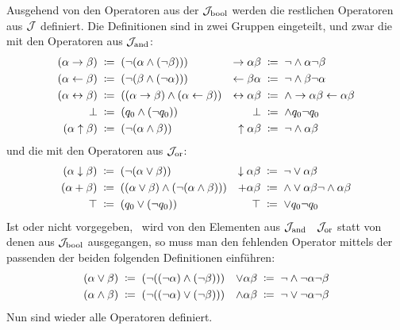 Ausgehend von den Operatoren aus der  $\mathcal{J}_{\mathrm{bool}}$ werden die restlichen Operatoren aus $\mathcal{J}$ definiert. Die Definitionen sind in zwei Gruppen eingeteilt, und zwar die mit den Operatoren aus $\mathcal{J}_{\mathrm{and}}$:
\begin{align}
	(\alpha \rightarrow \beta) &\;\coloneqq\; (\lnot (\alpha \land  (\lnot \beta))) &
	\rightarrow \alpha \beta   &\;\coloneqq\;  \lnot    \land \alpha \lnot \beta
	\label{def:imp}
	\\
	(\alpha \leftarrow \beta) &\;\coloneqq\; (\lnot (\beta \land  (\lnot \alpha))) &
	\leftarrow \beta  \alpha  &\;\coloneqq\;  \lnot    \land \beta \lnot \alpha
	\label{def:rep}
	\\
	(\alpha\leftrightarrow\beta) &\;\coloneqq\;((\alpha\rightarrow\beta)\land(\alpha\leftarrow\beta))&
	\leftrightarrow\alpha \beta  &\;\coloneqq\;\land \rightarrow \alpha \beta \leftarrow \alpha \beta
	\label{def:equiv}
	\\
	\bot              &\;\coloneqq\; (q_0 \land (\lnot q_0)) &
	\bot              &\;\coloneqq\;  \land q_0  \lnot q_0   \label{def:false}
	\\
	(\alpha \uparrow \beta)&\;\coloneqq\; (\lnot (\alpha \land \beta )) &
	\uparrow \alpha  \beta &\;\coloneqq\;  \lnot  \land \alpha \beta \label{def:nand}
\end{align}
und die mit den Operatoren aus $\mathcal{J}_{\mathrm{or}}$:
\begin{align}
	(\alpha \downarrow \beta) &\;\coloneqq\; (\lnot (\alpha \lor \beta))   &
	\downarrow \alpha  \beta  & \;\coloneqq\;  \lnot  \lor \alpha \beta \label{def:nor}
	\\
	(\alpha+\beta)&\;\coloneqq\;((\alpha\lor\beta)\land(\lnot(\alpha\land\beta)))&
	+\alpha \beta &\;\coloneqq\;  \land \lor\alpha\beta \lnot \land\alpha\beta
	\label{def:add}
	\\
	\top & \;\coloneqq\; (q_0 \lor (\lnot q_0)) &
	\top & \;\coloneqq\;  \lor q_0  \lnot q_0
	\label{def:true}
\end{align}
%
Ist \symqt{\lor} oder \symqt{\land} nicht vorgegeben, \textdh\ wird von den Elementen aus $\mathcal{J}_{\mathrm{and}}$ \textbzgl\ $\mathcal{J}_{\mathrm{or}}$ statt von denen aus $\mathcal{J}_{\mathrm{bool}}$ ausgegangen, so muss man den fehlenden Operator mittels der passenden der beiden folgenden Definitionen einführen:
\begin{align}
	(\alpha \lor \beta)  & \;\coloneqq\; (\lnot((\lnot\alpha)\land(\lnot\beta))) &
	\lor \alpha  \beta   & \;\coloneqq\;  \lnot \land \lnot \alpha \lnot \beta
	\label{def:orand} \\
	(\alpha \land \beta) & \;\coloneqq\; (\lnot((\lnot\alpha)\lor(\lnot\beta)))  &
	\land \alpha  \beta  & \;\coloneqq\;  \lnot \lor \lnot \alpha \lnot \beta
	\label{def:andor}
\end{align}
Nun sind wieder alle Operatoren definiert.

